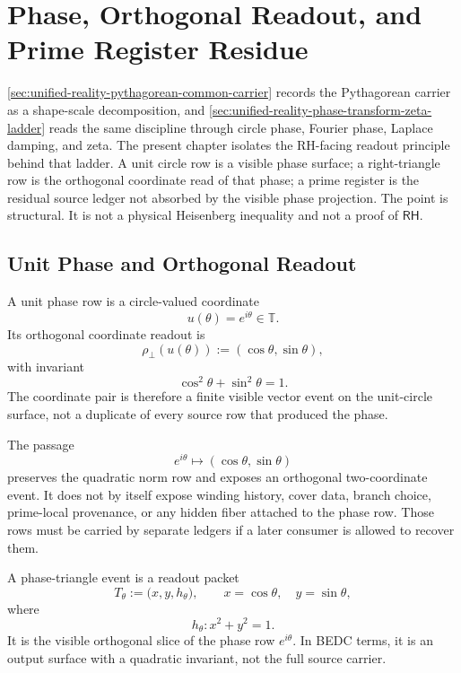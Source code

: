 \chapter{Phase, Orthogonal Readout, and Prime Register Residue}
\label{ch:visions-rh-phase-triangle-prime-register-readout}

\autoref{sec:unified-reality-pythagorean-common-carrier} records the
Pythagorean carrier as a shape-scale decomposition, and
\autoref{sec:unified-reality-phase-transform-zeta-ladder} reads the same
discipline through circle phase, Fourier phase, Laplace damping, and
zeta. The present chapter isolates the RH-facing readout principle behind
that ladder. A unit circle row is a visible phase surface; a right-triangle
row is the orthogonal coordinate read of that phase; a prime register is
the residual source ledger not absorbed by the visible phase projection.
The point is structural. It is not a physical Heisenberg inequality and
not a proof of $\mathsf{RH}$.

\section{Unit Phase and Orthogonal Readout}
\label{sec:rh-phase-triangle-unit-readout}

\begin{definition}
\label{def:rh-unit-phase-readout}
A unit phase row is a circle-valued coordinate
$$
u(\theta)=e^{i\theta}\in\mathbb T.
$$
Its orthogonal coordinate readout is
$$
\rho_{\perp}(u(\theta))
:=
(\cos\theta,\sin\theta),
$$
with invariant
$$
\cos^2\theta+\sin^2\theta=1.
$$
The coordinate pair is therefore a finite visible vector event on the
unit-circle surface, not a duplicate of every source row that produced
the phase.
\end{definition}

\begin{principle}
\label{prin:rh-triangle-readout-preserves-norm-hides-provenance}
The passage
$$
e^{i\theta}\mapsto(\cos\theta,\sin\theta)
$$
preserves the quadratic norm row and exposes an orthogonal two-coordinate
event. It does not by itself expose winding history, cover data, branch
choice, prime-local provenance, or any hidden fiber attached to the phase
row. Those rows must be carried by separate ledgers if a later consumer
is allowed to recover them.
\end{principle}

\begin{definition}
\label{def:rh-phase-triangle-event}
A phase-triangle event is a readout packet
$$
T_{\theta}
:=
\bigl(x,y,h_{\theta}\bigr),
\qquad
x=\cos\theta,\quad y=\sin\theta,
$$
where
$$
h_{\theta}:x^2+y^2=1.
$$
It is the visible orthogonal slice of the phase row $e^{i\theta}$. In BEDC
terms, it is an output surface with a quadratic invariant, not the full
source carrier.
\end{definition}

